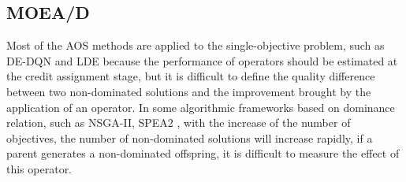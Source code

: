 \documentclass[journal]{IEEEtran}
\begin{document}
\subsection{MOEA/D}
Most of the AOS methods are applied to the single-objective problem, such as DE-DQN \cite{sharma2019deep} and LDE \cite{sun2021learning} because the performance of operators should be estimated at the credit assignment stage, but it is difficult to define the quality difference between two non-dominated solutions and the improvement brought by the application of an operator.
In some algorithmic frameworks based on dominance relation, such as NSGA-II\cite{nsga2}, SPEA2 \cite{spea2}, with the increase of the number of objectives, the number of non-dominated solutions will increase rapidly,
if a parent generates a non-dominated offspring, it is difficult to measure the effect of this operator.
\end{document}
